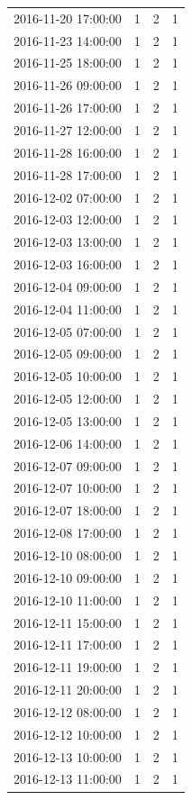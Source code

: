 \begin{tabular}{lrrr}
2016-11-20 17:00:00 & 1 & 2 & 1 \\
2016-11-23 14:00:00 & 1 & 2 & 1 \\
2016-11-25 18:00:00 & 1 & 2 & 1 \\
2016-11-26 09:00:00 & 1 & 2 & 1 \\
2016-11-26 17:00:00 & 1 & 2 & 1 \\
2016-11-27 12:00:00 & 1 & 2 & 1 \\
2016-11-28 16:00:00 & 1 & 2 & 1 \\
2016-11-28 17:00:00 & 1 & 2 & 1 \\
2016-12-02 07:00:00 & 1 & 2 & 1 \\
2016-12-03 12:00:00 & 1 & 2 & 1 \\
2016-12-03 13:00:00 & 1 & 2 & 1 \\
2016-12-03 16:00:00 & 1 & 2 & 1 \\
2016-12-04 09:00:00 & 1 & 2 & 1 \\
2016-12-04 11:00:00 & 1 & 2 & 1 \\
2016-12-05 07:00:00 & 1 & 2 & 1 \\
2016-12-05 09:00:00 & 1 & 2 & 1 \\
2016-12-05 10:00:00 & 1 & 2 & 1 \\
2016-12-05 12:00:00 & 1 & 2 & 1 \\
2016-12-05 13:00:00 & 1 & 2 & 1 \\
2016-12-06 14:00:00 & 1 & 2 & 1 \\
2016-12-07 09:00:00 & 1 & 2 & 1 \\
2016-12-07 10:00:00 & 1 & 2 & 1 \\
2016-12-07 18:00:00 & 1 & 2 & 1 \\
2016-12-08 17:00:00 & 1 & 2 & 1 \\
2016-12-10 08:00:00 & 1 & 2 & 1 \\
2016-12-10 09:00:00 & 1 & 2 & 1 \\
2016-12-10 11:00:00 & 1 & 2 & 1 \\
2016-12-11 15:00:00 & 1 & 2 & 1 \\
2016-12-11 17:00:00 & 1 & 2 & 1 \\
2016-12-11 19:00:00 & 1 & 2 & 1 \\
2016-12-11 20:00:00 & 1 & 2 & 1 \\
2016-12-12 08:00:00 & 1 & 2 & 1 \\
2016-12-12 10:00:00 & 1 & 2 & 1 \\
2016-12-13 10:00:00 & 1 & 2 & 1 \\
2016-12-13 11:00:00 & 1 & 2 & 1 \\

\end{tabular}
